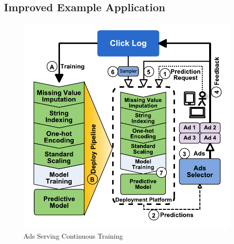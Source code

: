 \subsection{Improved Example Application}
\begin{figure}[t]
\centering
\includegraphics[width=\columnwidth]{../images/improved-example-vertical-small-cropped.pdf}
\caption{Ads Serving Continuous Training}
\label{fig:improved-example}
\end{figure}


